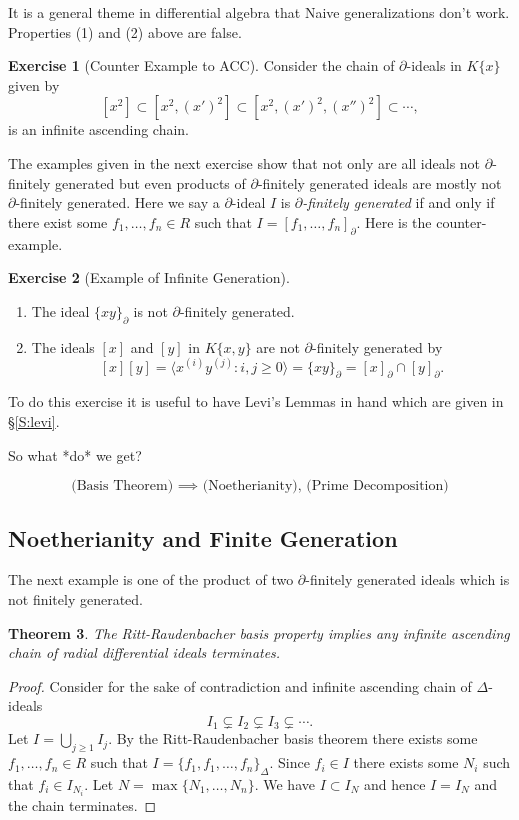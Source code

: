 \documentclass[12pt]{book}
\numberwithin{equation}{section}
\newtheorem{theorem}{Theorem}[subsection]
\theoremstyle{definition}
\newtheorem{exercise}[theorem]{Exercise}
\theoremstyle{remark}
\begin{document}
It is a general theme in differential algebra that Naive generalizations don't work. 
Properties (1) and (2) above are false. 
\begin{exercise}[Counter Example to ACC]
	Consider the chain of $\partial$-ideals in $K\lbrace x \rbrace$ given by 
	$$ [x^2]  \subset [x^2, (x')^2] \subset [ x^2, (x')^2, (x'')^2 ] \subset \cdots, $$
	is an infinite ascending chain.
\end{exercise}

The examples given in the next exercise show that not only are all ideals not $\partial$-finitely generated but even products of $\partial$-finitely generated ideals are mostly not $\partial$-finitely generated.
Here we say a $\partial$-ideal $I$ is \emph{$\partial$-finitely generated} if and only if there exist some $f_1,\ldots,f_n \in R$ such that $I=[f_1,\ldots,f_n]_{\partial}$.
Here is the counter-example.
\begin{exercise}[Example of Infinite Generation]
	\begin{enumerate}
		\item The ideal $\lbrace x y\rbrace_{\partial}$ is not $\partial$-finitely generated.
		\item The ideals $[x]$ and $[y]$ in $K\lbrace x,y\rbrace$ are not $\partial$-finitely generated by 
		$$[x][y] = \langle x^{(i)}y^{(j)} \colon i,j \geq 0 \rangle = \lbrace xy \rbrace_{\partial} = [x]_{\partial} \cap [y]_{\partial}.$$ 
	\end{enumerate}
\end{exercise}
To do this exercise it is useful to have Levi's Lemmas in hand which are given in \S\ref{S:levi}.

So what *do* we get?



$$ \mbox{ (Basis Theorem) $\implies$ (Noetherianity), (Prime Decomposition) }$$



\subsection{Noetherianity and Finite Generation}

The next example is one of the product of two $\partial$-finitely generated ideals which is not finitely generated. 

\begin{theorem}
The Ritt-Raudenbacher basis property implies any infinite ascending chain of radial differential ideals terminates.
\end{theorem}
\begin{proof}
	Consider for the sake of contradiction and infinite ascending chain of $\Delta$-ideals
	 $$I_1 \subsetneq I_2 \subsetneq I_3 \subsetneq \cdots. $$
	Let $I = \bigcup_{j \geq 1} I_j$.
	By the Ritt-Raudenbacher basis theorem there exists some $f_1,\ldots,f_n\in R$ such that $I = \lbrace f_1,f_1,\ldots,f_n\rbrace_{\Delta}$.
	Since $f_i \in I$ there exists some $N_i$ such that $f_i \in I_{N_i}$. 
	Let $N= \max\lbrace N_1,\ldots,N_n\rbrace$. 
	We have $I \subset I_N$ and hence $I=I_N$ and the chain terminates.
\end{proof}
\end{document}
